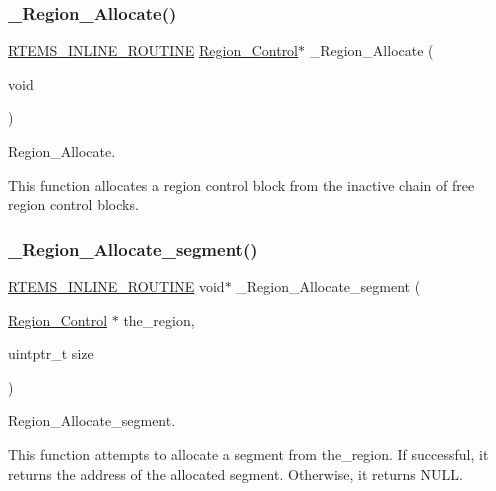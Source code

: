 \subsubsection{\texorpdfstring{\_Region\_Allocate()}{\_Region\_Allocate()}}
{\footnotesize\ttfamily \mbox{\hyperlink{group__RTEMSScoreBaseDefs_gac216239df231d5dbd15e3520b0b9313f}{R\+T\+E\+M\+S\+\_\+\+I\+N\+L\+I\+N\+E\+\_\+\+R\+O\+U\+T\+I\+NE}} \mbox{\hyperlink{structRegion__Control}{Region\+\_\+\+Control}}$\ast$ \+\_\+\+Region\+\_\+\+Allocate (\begin{DoxyParamCaption}\item[{void}]{ }\end{DoxyParamCaption})}



Region\+\_\+\+Allocate. 

This function allocates a region control block from the inactive chain of free region control blocks. \mbox{\label{group__ClassicRegionImpl_ga832ceefdcf5076c6aae60d4d0762a2e2}} 
\subsubsection{\texorpdfstring{\_Region\_Allocate\_segment()}{\_Region\_Allocate\_segment()}}
{\footnotesize\ttfamily \mbox{\hyperlink{group__RTEMSScoreBaseDefs_gac216239df231d5dbd15e3520b0b9313f}{R\+T\+E\+M\+S\+\_\+\+I\+N\+L\+I\+N\+E\+\_\+\+R\+O\+U\+T\+I\+NE}} void$\ast$ \+\_\+\+Region\+\_\+\+Allocate\+\_\+segment (\begin{DoxyParamCaption}\item[{\mbox{\hyperlink{structRegion__Control}{Region\+\_\+\+Control}} $\ast$}]{the\+\_\+region,  }\item[{uintptr\+\_\+t}]{size }\end{DoxyParamCaption})}



Region\+\_\+\+Allocate\+\_\+segment. 

This function attempts to allocate a segment from the\+\_\+region. If successful, it returns the address of the allocated segment. Otherwise, it returns N\+U\+LL. \mbox{\label{group__ClassicRegionImpl_ga27b8c2e206200f0fc192b8454f046603}} 
